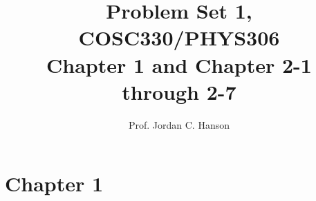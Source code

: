 \documentclass[11pt]{article}
\begin{document}
\twocolumn

\title{Problem Set 1, COSC330/PHYS306\\
Chapter 1 and Chapter 2-1 through 2-7}

\author{Prof. Jordan C. Hanson}

\maketitle


\section{Chapter 1}
\end{document}
